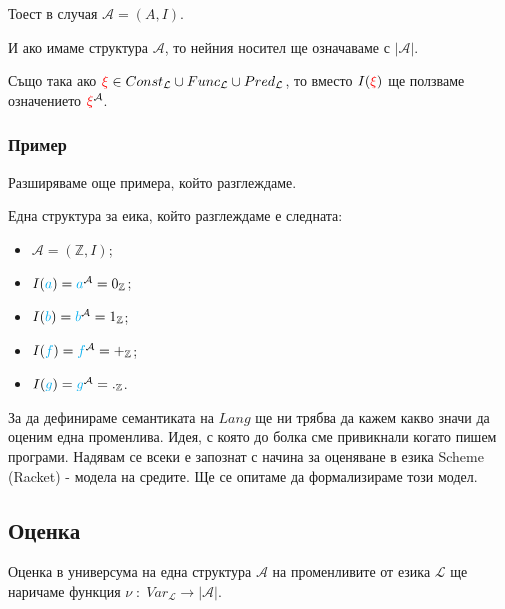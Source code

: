\documentclass{article}[12pt]
\newcommand{\Lang}{\mathcal{L}}
\begin{document}
\vspace{0.3cm}

Тоест в случая \(\mathcal{A} = (A, I)\).

\vspace{0.3cm}

И ако имаме структура \(\mathcal{A}\),
то нейния носител ще означаваме с \(|\mathcal{A}|\).

\vspace{0.3cm}

Също така ако \(\color{red} \xi \color{black} \in Const_\Lang \cup Func_\Lang \cup Pred_\Lang\),
то вместо \(I(\color{red} \xi \color{black})\) ще ползваме означението \(\color{red}\xi \color{black} ^{\mathcal{A}}\).

\subsubsection{Пример}

Разширяваме още примера, който разглеждаме.

Една структура за еика, който разглеждаме е следната:

\begin{itemize}
\item \(\mathcal{A} = (\mathbb{Z}, I)\);
\item \(I(\color{cyan} a \color{black}) = \color{cyan} a \color{black}^{\mathcal{A}} = 0_\mathbb{Z}\);
\item \(I(\color{cyan} b \color{black}) = \color{cyan} b \color{black}^{\mathcal{A}} = 1_\mathbb{Z}\);
\item \(I(\color{cyan} f \color{black}) = \color{cyan} f \color{black}^{\mathcal{A}} = +_\mathbb{Z}\);
\item \(I(\color{cyan} g \color{black}) = \color{cyan} g \color{black}^{\mathcal{A}} = ._\mathbb{Z}\).
\end{itemize}

За да дефинираме семантиката на \(Lang\) ще ни трябва да кажем какво значи да оценим една променлива.
Идея, с която до болка сме привикнали когато пишем програми.
Надявам се всеки е запознат с начина за оценяване в езика Scheme (Racket) - модела на средите.
Ще се опитаме да формализираме този модел.

\subsection{Оценка}

Оценка в универсума на една структура \(\mathcal{A}\) на променливите от езика \(\Lang\)
ще наричаме функция \(\nu \; : \; Var_\Lang \to |\mathcal{A}| \).
\end{document}

